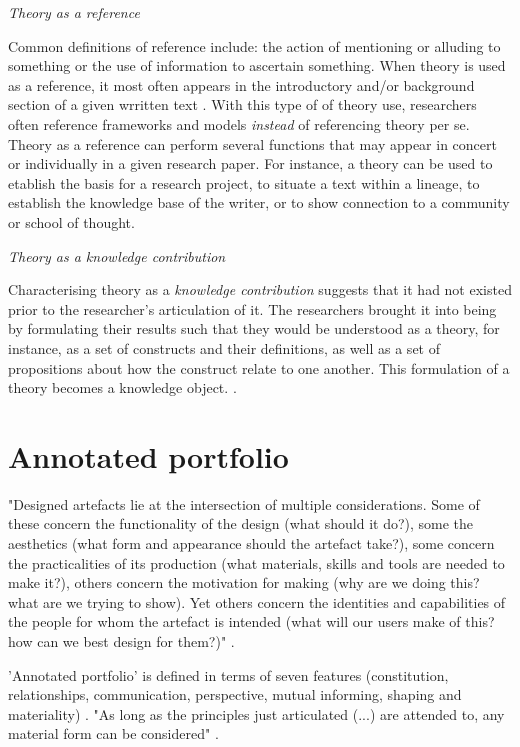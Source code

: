 \par \emph{Theory as a reference} \par
Common definitions of reference include: the action of mentioning or alluding to something or the use of information to ascertain something. When theory is used as a reference, it most often appears in the introductory and/or background section of a given wrritten text \autocite[p. 128]{beck_examining_2016}. With this type of of theory use, researchers often reference frameworks and models \emph{instead} of referencing theory per se. Theory as a reference can perform several functions that may appear in concert or individually in a given research paper. For instance, a theory can be used to etablish the basis for a research project, to situate a text within a lineage, to establish the knowledge base of the writer, or to show connection to a community or school of thought. 
\par

\par \emph{Theory as a knowledge contribution} \par
Characterising theory as a \emph{knowledge contribution} suggests that it had not existed prior to the researcher's articulation of it. The researchers brought it into being by formulating their results such that they would be understood as a theory, for instance, as a set of constructs and their definitions, as well as a set of propositions about how the construct relate to one another. This formulation of a theory becomes a knowledge object. \autocite[p. 128]{beck_examining_2016}.


\section{Annotated portfolio}
"Designed artefacts lie at the intersection of multiple considerations. Some of these concern the functionality of the design (what should it do?), some the aesthetics (what form and appearance should the artefact take?), some concern the practicalities of its production (what materials, skills and tools are needed to make it?), others concern the motivation for making (why are we doing this? what are we trying to show). Yet others concern the identities and capabilities of the people for whom the artefact is intended (what will our users make of this? how can we best design for them?)" \autocite[p. 70]{bowers_annotated_2012}. 

'Annotated portfolio' is defined in terms of seven features (constitution, relationships, communication, perspective, mutual informing, shaping and materiality) \autocite[p. 71]{bowers_annotated_2012}. "As long as the principles just articulated (...) are attended to, any material form can be considered" \autocite[p. 73]{bowers_annotated_2012}.

